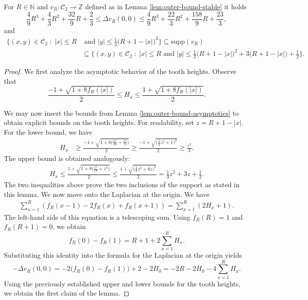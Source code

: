 \documentclass[10pt,a4paper]{amsart}
\begin{document}
\begin{lemma}\label{lem:outer-bound-teeth-and-laplace}
For  $R\in\mathbb{N}$ and $v_R:\mathcal{C}_2\to\mathbb{Z}$ defined as in Lemma \ref{lem:outer-bound-stable} it holds
    $$\frac{4}{9}R^3+\frac{4}{3}R^2+\frac{32}{9}R+\frac{2}{3}\leq \Delta v_R(0,0)\leq \frac{4}{9}R^3+\frac{22}{3}R^2+\frac{158}{9}R+\frac{23}{3},$$
    and 
    \begin{align*}
    \Big\{(x,y)\in\mathcal{C}_2\;:\; \vert x\vert\leq R&\text{ and }\vert y\vert \leq \frac{1}{3}\big(R+1-|x|\big)^2\Big\}\subseteq \text{supp}(v_R)\\
    &\subseteq\Big\{(x,y)\in\mathcal{C}_2\;:\; \vert x\vert\leq R \text{ and } \vert y\vert \leq \frac{1}{3}\big(R+1-|x|\big)^2+3\big(R+1-|x|\big)+\frac{1}{2}\Big\}.\end{align*}
\end{lemma}

\begin{proof}
    We first analyze the asymptotic behavior of the tooth heights. Observe that
    \[
    \frac{-1+\sqrt{1+8f_R(|x|)}}{2}\leq H_x\leq \frac{1+\sqrt{1+8f_R(|x|)}}{2}.
    \]

  We may now insert the bounds from Lemma \ref{lem:outer-bound-asymptotics} to obtain explicit bounds on the tooth heights. For readability, set $z=R+1-|x|$. For the lower bound, we have
    \begin{align*}
        H_x&\geq\frac{-1+\sqrt{1+8\big(\frac{z^4}{18}+\frac{z^2}{2}\big)}}{2}\geq \frac{-1+\sqrt{\big(\frac{2}{3}z^2+1\big)^2}}{2}\geq \frac{z^2}{3}.
    \end{align*}
    The upper bound is obtained analogously:
    \begin{align*}
        H_x\leq \frac{1+\sqrt{1+8\big(\frac{z^4}{18}+z^3\big)}}{2}\leq \frac{1+\sqrt{\big(\frac{2}{3}z^2+6z\big)^2}}{2}=\frac{1}{3}z^2+3z+\frac{1}{2}.
    \end{align*}
    The two inequalities above prove the two inclusions of the support as stated in this lemma. We now move onto the Laplacian at the origin. We have
    \begin{align*}
        \sum_{x=1}^R \left(f_R({x-1})-2f_R(x)+f_R({x+1})\right)=\sum_{x=1}^R\left(2H_x+1\right).
    \end{align*}
    The left-hand side of this equation is a telescoping sum. Using $f_R(R)=1$ and $f_R(R+1)=0$, we obtain
    \[
    f_R(0)-f_R(1)=R+1+2\sum_{x=1}^R H_x.
    \]
Substituting this identity into the formula for the Laplacian at the origin yields
\[
-\Delta v_R(0,0)=-2\bigl(f_R(0)-f_R(1)\bigr)+2-2H_0=-2R-2H_0-4\sum_{x=1}^R H_x.
\]
Using the previously established upper and lower bounds for the tooth heights, we obtain
the first claim of the lemma.
\end{proof}
\end{document}
